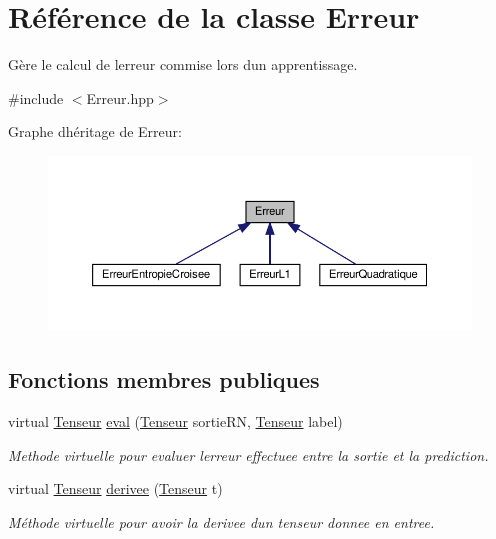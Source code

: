 \hypertarget{classErreur}{}\section{Référence de la classe Erreur}
\label{classErreur}


Gère le calcul de l\textquotesingle{}erreur commise lors d\textquotesingle{}un apprentissage.  




{\ttfamily \#include $<$Erreur.\+hpp$>$}



Graphe d\textquotesingle{}héritage de Erreur\+:
\nopagebreak
\begin{figure}[H]
\begin{center}
\leavevmode
\includegraphics[width=350pt]{classErreur__inherit__graph}
\end{center}
\end{figure}
\subsection*{Fonctions membres publiques}
\begin{DoxyCompactItemize}
\item 
virtual \hyperlink{classTenseur}{Tenseur} \hyperlink{classErreur_a0def45df23074388e2a338145aeb4660}{eval} (\hyperlink{classTenseur}{Tenseur} sortie\+RN, \hyperlink{classTenseur}{Tenseur} label)
\begin{DoxyCompactList}\small\item\em Methode virtuelle pour evaluer l\textquotesingle{}erreur effectuee entre la sortie et la prediction. \end{DoxyCompactList}\item 
virtual \hyperlink{classTenseur}{Tenseur} \hyperlink{classErreur_ad56634307e3ceb8ab5c2fddede28422a}{derivee} (\hyperlink{classTenseur}{Tenseur} t)
\begin{DoxyCompactList}\small\item\em Méthode virtuelle pour avoir la derivee d\textquotesingle{}un tenseur donnee en entree. \end{DoxyCompactList}\end{DoxyCompactItemize}


